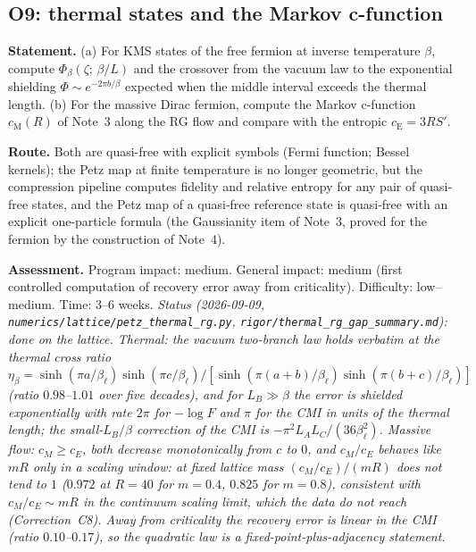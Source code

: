 \documentclass[11pt]{article}
\theoremstyle{accent}
\theoremstyle{definition}
\begin{document}
\subsection{O9: thermal states and the Markov c-function}\label{sec:O9}
\textbf{Statement.} (a) For KMS states of the free fermion at inverse temperature \(\beta\), compute \(\Phi_\beta(\zeta;\,\beta/L)\) and the crossover from the vacuum law to the exponential shielding \(\Phi\sim e^{-2\pi b/\beta}\) expected when the middle interval exceeds the thermal length.  (b) For the massive Dirac fermion, compute the Markov c-function \(c_{\mathrm M}(R)\) of Note~3 along the RG flow and compare with the entropic \(c_{\mathrm E}=3RS'\).

\textbf{Route.} Both are quasi-free with explicit symbols (Fermi function; Bessel kernels); the Petz map at finite temperature is no longer geometric, but the compression pipeline computes fidelity and relative entropy for any pair of quasi-free states, and the Petz map of a quasi-free reference state is quasi-free with an explicit one-particle formula (the Gaussianity item of Note~3, proved for the fermion by the construction of Note~4).

\textbf{Assessment.} Program impact: medium.  General impact: medium (first controlled computation of recovery error away from criticality).  Difficulty: low--medium.  Time: 3--6 weeks.  \emph{Status (2026-09-09, \texttt{numerics/lattice/petz\_thermal\_rg.py}, \texttt{rigor/thermal\_rg\_gap\_summary.md}): done on the lattice.  Thermal: the vacuum two-branch law holds verbatim at the thermal cross ratio \(\eta_\beta=\sinh(\pi a/\beta_\ell)\sinh(\pi c/\beta_\ell)/[\sinh(\pi(a+b)/\beta_\ell)\sinh(\pi(b+c)/\beta_\ell)]\) (ratio \(0.98\)--\(1.01\) over five decades), and for \(L_B\gg\beta\) the error is shielded exponentially with rate \(2\pi\) for \(-\log F\) and \(\pi\) for the CMI in units of the thermal length; the small-\(L_B/\beta\) correction of the CMI is \(-\pi^2L_AL_C/(36\beta_\ell^2)\).  Massive flow: \(c_M\ge c_E\), both decrease monotonically from \(c\) to \(0\), and \(c_M/c_E\) behaves like \(mR\) only in a scaling window: at fixed lattice mass \((c_M/c_E)/(mR)\) does not tend to \(1\) (\(0.972\) at \(R=40\) for \(m=0.4\), \(0.825\) for \(m=0.8\)), consistent with \(c_M/c_E\sim mR\) in the continuum scaling limit, which the data do not reach (Correction~C8).  Away from criticality the recovery error is \emph{linear} in the CMI (ratio \(0.10\)--\(0.17\)), so the quadratic law is a fixed-point-plus-adjacency statement.}
\end{document}
